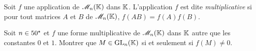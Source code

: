 \begin{defi}
    Soit $f$ une application de $\mathscr{M}_n(\mathbb{K})$ dans $\mathbb{K}$. L'application $f$ est dite \emph{multiplicative} si pour tout matrices $A$ et $B$ de $\mathscr{M}_n(\mathbb{K})$, $f(AB) = f(A)f(B)$.
\end{defi}
\begin{exercice}
    Soit $n \in 50^\star$ et $f$ une forme multiplicative de $\mathscr{M}_n(\mathbb{K})$ dans $\mathbb{K}$ autre que les constantes $0$ et $1$. Montrer que $M \in \mathrm{GL}_n(\mathbb{K})$ si et seulement si $f(M) \not= 0$. 
\end{exercice}
